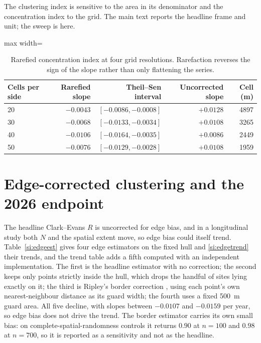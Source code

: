 \documentclass[fleqn,10pt]{wlpeerj}
\begin{document}
The clustering index is sensitive to the area in its denominator and the concentration index to
the grid. The main text reports the headline frame and unit; the sweep is here.

\begin{table}[H]
\centering
\caption{Rarefied concentration index at four grid resolutions. Rarefaction reverses the sign of the slope rather than only flattening the series.}
\label{si:ginigrid}
\small
\begin{adjustbox}{max width=\linewidth}
\begin{tabular}{lrrrr}
\toprule
Cells per side & Rarefied slope & Theil--Sen interval & Uncorrected slope & Cell (m) \\
\midrule
20 & $-0.0043$ & $[-0.0086, -0.0008]$ & $+0.0128$ & 4897 \\
30 & $-0.0068$ & $[-0.0133, -0.0034]$ & $+0.0108$ & 3265 \\
40 & $-0.0106$ & $[-0.0164, -0.0035]$ & $+0.0086$ & 2449 \\
50 & $-0.0076$ & $[-0.0129, -0.0028]$ & $+0.0108$ & 1959 \\
\bottomrule
\end{tabular}
\end{adjustbox}
\end{table}

\section{Edge-corrected clustering and the 2026 endpoint}
\label{si:edge}

The headline Clark--Evans $R$ is uncorrected for edge bias, and in a longitudinal study both
$N$ and the spatial extent move, so edge bias could itself trend. Table~\ref{si:edgeest} gives
four edge estimators on the fixed hull and \ref{si:edgetrend} their trends, and the trend table
adds a fifth computed with an independent implementation. The first is the
headline estimator with no correction; the second keeps only points strictly inside the hull,
which drops the handful of sites lying exactly on it; the third is Ripley's border correction
\citep{ripley1977modelling},
using each point's own nearest-neighbour distance as its guard width; the fourth uses a fixed
\SI{500}{\meter} guard area. All five decline, with slopes between $-0.0107$ and $-0.0159$ per
year, so edge bias does not drive the trend. The border estimator carries its own small bias:
on complete-spatial-randomness controls it returns $0.90$ at $n = 100$ and $0.98$ at $n = 700$,
so it is reported as a sensitivity and not as the headline.
\end{document}
